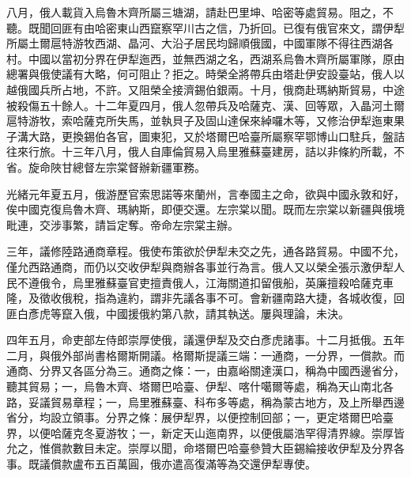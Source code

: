 \begin{pinyinscope}
八月，俄人載貨入烏魯木齊所屬三塘湖，請赴巴里坤、哈密等處貿易。阻之，不聽。既聞回匪有由哈密東山西竄察罕川古之信，乃折回。已復有俄官來文，謂伊犁所屬土爾扈特游牧西湖、晶河、大沿子居民均歸順俄國，中國軍隊不得往西湖各村。中國以當初分界在伊犁迤西，並無西湖之名，西湖系烏魯木齊所屬軍隊，原由總署與俄使議有大略，何可阻止？拒之。時榮全將帶兵由塔赴伊安設臺站，俄人以越俄國兵所占地，不許。又阻榮全接濟錫伯銀兩。十月，俄商赴瑪納斯貿易，中途被殺傷五十餘人。十二年夏四月，俄人忽帶兵及哈薩克、漢、回等眾，入晶河土爾扈特游牧，索哈薩克所失馬，並執貝子及固山達保來綽囉木等，又修治伊犁迤東果子溝大路，更換錫伯各官，圖東犯，又於塔爾巴哈臺所屬察罕鄂博山口駐兵，盤詰往來行旅。十三年八月，俄人自庫倫貿易入烏里雅蘇臺建房，詰以非條約所載，不省。旋命陜甘總督左宗棠督辦新疆軍務。

光緒元年夏五月，俄游歷官索思諾等來蘭州，言奉國主之命，欲與中國永敦和好，俟中國克復烏魯木齊、瑪納斯，即便交還。左宗棠以聞。既而左宗棠以新疆與俄境毗連，交涉事繁，請旨定奪。帝命左宗棠主辦。

三年，議修陸路通商章程。俄使布策欲於伊犁未交之先，通各路貿易。中國不允，僅允西路通商，而仍以交收伊犁與商辦各事並行為言。俄人又以榮全張示激伊犁人民不遵俄令，烏里雅蘇臺官吏擅責俄人，江海關道扣留俄船，英廉擅殺哈薩克車隆，及徵收俄稅，指為違約，謂非先議各事不可。會新疆南路大捷，各城收復，回匪白彥虎等竄入俄，中國援俄約第八款，請其執送。屢與理論，未決。

四年五月，命吏部左侍郎崇厚使俄，議還伊犁及交白彥虎諸事。十二月抵俄。五年二月，與俄外部尚書格爾斯開議。格爾斯提議三端：一通商，一分界，一償款。而通商、分界又各區分為三。通商之條：一，由嘉峪關達漢口，稱為中國西邊省分，聽其貿易；一，烏魯木齊、塔爾巴哈臺、伊犁、喀什噶爾等處，稱為天山南北各路，妥議貿易章程；一，烏里雅蘇臺、科布多等處，稱為蒙古地方，及上所舉西邊省分，均設立領事。分界之條：展伊犁界，以便控制回部；一，更定塔爾巴哈臺界，以便哈薩克冬夏游牧；一，新定天山迤南界，以便俄屬浩罕得清界線。崇厚皆允之，惟償款數目未定。崇厚以聞，命塔爾巴哈臺參贊大臣錫綸接收伊犁及分界各事。既議償款盧布五百萬圓，俄亦遣高復滿等為交還伊犁專使。


\end{pinyinscope}
